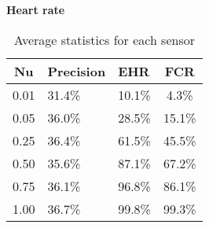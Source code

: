 \begin{table}[H]
  \vspace{4pt}

  \textbf{Heart rate}\vspace{2pt}
  \begin{tabularx}{\columnwidth}{cXXc}
    \toprule
    \textbf{Nu} & \textbf{Precision} & \textbf{EHR} & \textbf{FCR} \\
    \midrule
    0.01 & 31.4\% & 10.1\% & 4.3\% \\ \hline
    0.05 & 36.0\% & 28.5\% & 15.1\% \\ \hline
    0.25 & 36.4\% & 61.5\% & 45.5\% \\ \hline
    0.50 & 35.6\% & 87.1\% & 67.2\% \\ \hline
    0.75 & 36.1\% & 96.8\% & 86.1\% \\ \hline
    1.00 & 36.7\% & 99.8\% & 99.3\% \\ \hline
    \bottomrule
  \end{tabularx}

  \caption{Average statistics for each sensor}
  \label{[TABLE] avg_stats_sensors}
\end{table}